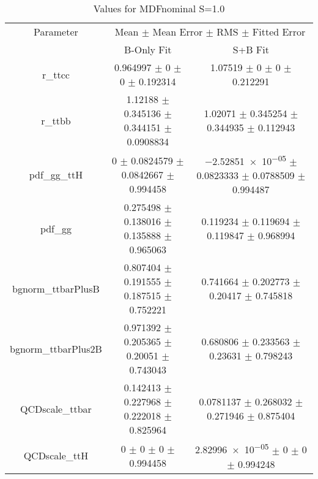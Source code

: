 \begin{table}
\centering
\caption{Values for MDFnominal S=1.0}
\begin{tabular}{ccc}
\toprule
Parameter & \multicolumn{2}{c}{Mean $\pm$ Mean Error $\pm$ RMS $\pm$ Fitted Error}\\
 & B-Only Fit & S+B Fit\\
\midrule
r\_ttcc & \num{0.964997} $\pm$ \num{0} $\pm$ \num{0} $\pm$ \num{0.192314} & \num{1.07519} $\pm$ \num{0} $\pm$ \num{0} $\pm$ \num{0.212291}\\
r\_ttbb & \num{1.12188} $\pm$ \num{0.345136} $\pm$ \num{0.344151} $\pm$ \num{0.0908834} & \num{1.02071} $\pm$ \num{0.345254} $\pm$ \num{0.344935} $\pm$ \num{0.112943}\\
pdf\_gg\_ttH & \num{0} $\pm$ \num{0.0824579} $\pm$ \num{0.0842667} $\pm$ \num{0.994458} & \num{-2.52851e-05} $\pm$ \num{0.0823333} $\pm$ \num{0.0788509} $\pm$ \num{0.994487}\\
pdf\_gg & \num{0.275498} $\pm$ \num{0.138016} $\pm$ \num{0.135888} $\pm$ \num{0.965063} & \num{0.119234} $\pm$ \num{0.119694} $\pm$ \num{0.119847} $\pm$ \num{0.968994}\\
bgnorm\_ttbarPlusB & \num{0.807404} $\pm$ \num{0.191555} $\pm$ \num{0.187515} $\pm$ \num{0.752221} & \num{0.741664} $\pm$ \num{0.202773} $\pm$ \num{0.20417} $\pm$ \num{0.745818}\\
bgnorm\_ttbarPlus2B & \num{0.971392} $\pm$ \num{0.205365} $\pm$ \num{0.20051} $\pm$ \num{0.743043} & \num{0.680806} $\pm$ \num{0.233563} $\pm$ \num{0.23631} $\pm$ \num{0.798243}\\
QCDscale\_ttbar & \num{0.142413} $\pm$ \num{0.227968} $\pm$ \num{0.222018} $\pm$ \num{0.825964} & \num{0.0781137} $\pm$ \num{0.268032} $\pm$ \num{0.271946} $\pm$ \num{0.875404}\\
QCDscale\_ttH & \num{0} $\pm$ \num{0} $\pm$ \num{0} $\pm$ \num{0.994458} & \num{2.82996e-05} $\pm$ \num{0} $\pm$ \num{0} $\pm$ \num{0.994248}\\
\bottomrule
\end{tabular}
\end{table}